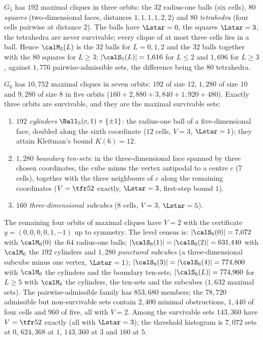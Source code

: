 \begin{theorem}\label{thm:m5}
$G_5$ has $192$ maximal cliques in three orbits: the $32$ radius-one balls (six cells), $80$ \emph{squares} (two-dimensional faces, distances $1,1,1,1,2,2$) and $80$ \emph{tetrahedra} (four cells pairwise at distance $2$). The balls have $\Lstar=0$, the squares $\Lstar=3$, the tetrahedra are never survivable; every clique of at most three cells lies in a ball. Hence $\calM_5(L)$ is the $32$ balls for $L=0,1,2$ and the $32$ balls together with the $80$ squares for $L\ge3$; $|\calS_5(L)|=1{,}616$ for $L\le2$ and $1{,}696$ for $L\ge3$, against $1{,}776$ pairwise-admissible sets, the difference being the $80$ tetrahedra.
\end{theorem}

\begin{theorem}\label{thm:m6}
$G_6$ has $10{,}752$ maximal cliques in seven orbits: $192$ of size $12$, $1{,}280$ of size $10$ and $9{,}280$ of size $8$ in five orbits ($160+2{,}880+3{,}840+1{,}920+480$). Exactly three orbits are survivable, and they are the maximal survivable sets:
\begin{enumerate}[leftmargin=2em,itemsep=1pt]
\item $192$ \emph{cylinders} $\Ball_5(c,1)\times\{\pm1\}$: the radius-one ball of a five-dimensional face, doubled along the sixth coordinate ($12$ cells, $V=3$, $\Lstar=1$); they attain Kleitman's bound $K(6)=12$.
\item $1{,}280$ \emph{boundary ten-sets}: in the three-dimensional face spanned by three chosen coordinates, the cube minus the vertex antipodal to a centre $c$ ($7$ cells), together with the three neighbours of $c$ along the remaining coordinates ($V=\tfr52$ exactly, $\Lstar=3$, first-step bound $1$).
\item $160$ \emph{three-dimensional subcubes} ($8$ cells, $V=3$, $\Lstar=5$).
\end{enumerate}
The remaining four orbits of maximal cliques have $V=2$ with the certificate $y=(0,0,0,0,1,-1)$ up to symmetry. The level census is: $|\calS_6(0)|=7{,}072$ with $\calM_6(0)$ the $64$ radius-one balls; $|\calS_6(1)|=|\calS_6(2)|=631{,}440$ with $\calM_6$ the $192$ cylinders and $1{,}280$ \emph{punctured subcubes} (a three-dimensional subcube minus one vertex, $\Lstar=1$); $|\calS_6(3)|=|\calS_6(4)|=774{,}800$ with $\calM_6$ the cylinders and the boundary ten-sets; $|\calS_6(L)|=774{,}960$ for $L\ge5$ with $\calM_6$ the cylinders, the ten-sets and the subcubes ($1{,}632$ maximal sets). The pairwise-admissible family has $853{,}680$ members; the $78{,}720$ admissible but non-survivable sets contain $2{,}400$ minimal obstructions, $1{,}440$ of four cells and $960$ of five, all with $V=2$. Among the survivable sets $143{,}360$ have $V=\tfr52$ exactly (all with $\Lstar=3$); the threshold histogram is $7{,}072$ sets at $0$, $624{,}368$ at $1$, $143{,}360$ at $3$ and $160$ at $5$.
\end{theorem}

